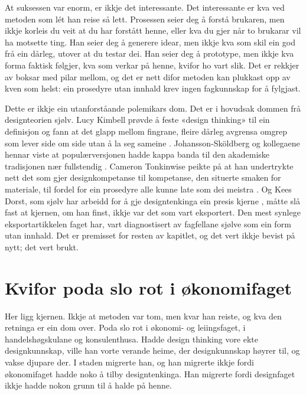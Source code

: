 At suksessen var enorm, er ikkje det interessante. Det interessante er kva ved metoden som lét han reise så lett. Prosessen seier deg å forstå brukaren, men ikkje korleis du veit at du har forstått henne, eller kva du gjer når to brukarar vil ha motsette ting. Han seier deg å generere idear, men ikkje kva som skil ein god frå ein dårleg, utover at du testar dei. Han seier deg å prototype, men ikkje kva forma faktisk følgjer, kva som verkar på henne, kvifor ho vart slik. Det er rekkjer av boksar med pilar mellom, og det er nett difor metoden kan plukkast opp av kven som helst: ein prosedyre utan innhald krev ingen fagkunnskap for å fylgjast.

Dette er ikkje ein utanforståande polemikars dom. Det er i hovudsak dommen frå designteorien sjølv. Lucy Kimbell prøvde å feste «design thinking» til ein definisjon og fann at det glapp mellom fingrane, fleire dårleg avgrensa omgrep som lever side om side utan å la seg sameine \autocite{kimbell2011,kimbell2012}. Johansson-Sköldberg og kollegaene hennar viste at populærversjonen hadde kappa banda til den akademiske tradisjonen nær fullstendig \autocite{johansson2013}. Cameron Tonkinwise peikte på at han undertrykte nett det som gjer designkompetanse til kompetanse, den situerte smaken for materiale, til fordel for ein prosedyre alle kunne late som dei meistra \autocite{tonkinwise2011}. Og Kees Dorst, som sjølv har arbeidd for å gje designtenkinga ein presis kjerne \autocite{cross2011dt}, måtte slå fast at kjernen, om han finst, ikkje var det som vart eksportert. Den mest synlege eksportartikkelen faget har, vart diagnostisert av fagfellane sjølve som ein form utan innhald. Det er premisset for resten av kapitlet, og det vert ikkje bevist på nytt; det vert brukt.

\section{Kvifor poda slo rot i økonomifaget}

Her ligg kjernen. Ikkje at metoden var tom, men kvar han reiste, og kva den retninga er ein dom over. Poda slo rot i økonomi- og leiingsfaget, i handelshøgskulane og konsulenthusa. Hadde design thinking vore ekte designkunnskap, ville han vorte verande heime, der designkunnskap høyrer til, og vakse djupare der. I staden migrerte han, og han migrerte ikkje fordi økonomifaget hadde noko å tilby designtenkinga. Han migrerte fordi designfaget ikkje hadde nokon grunn til å halde på henne.


